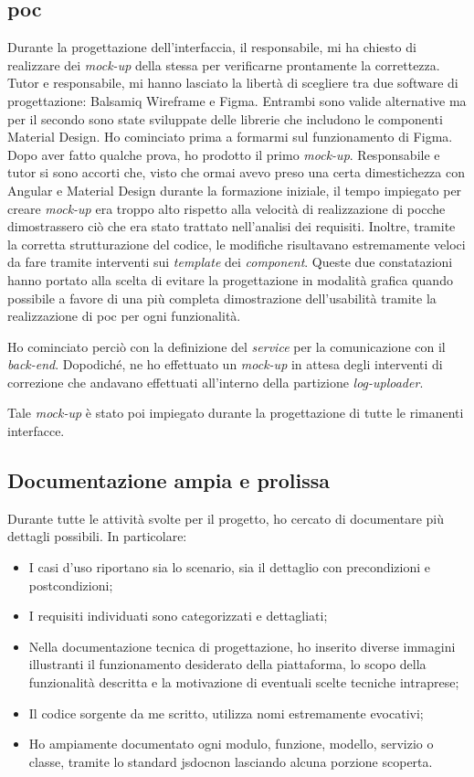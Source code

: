 \subsection{\acrlong{poc}}
Durante la progettazione dell'interfaccia, il responsabile, mi ha chiesto di realizzare dei \textit{mock-up} della stessa per verificarne prontamente la correttezza.
Tutor e responsabile, mi hanno lasciato la libertà di scegliere tra due software di progettazione: Balsamiq Wireframe e Figma. Entrambi sono valide alternative ma per il secondo sono state sviluppate delle librerie che includono le componenti Material Design.
Ho cominciato prima a formarmi sul funzionamento di Figma. Dopo aver fatto qualche prova, ho prodotto il primo \textit{mock-up}. Responsabile e tutor si sono accorti che, visto che ormai avevo preso una certa dimestichezza con Angular e Material Design durante la formazione iniziale, il tempo impiegato per creare \textit{mock-up} era troppo alto rispetto alla velocità di realizzazione di \acrshort{poc}\glsfirstoccur che dimostrassero ciò che era stato trattato nell'analisi dei requisiti. Inoltre, tramite la corretta strutturazione del codice, le modifiche risultavano estremamente veloci da fare tramite interventi sui \textit{template} dei \textit{component}.
Queste due constatazioni hanno portato alla scelta di evitare la progettazione in modalità grafica quando possibile a favore di una più completa dimostrazione dell'usabilità tramite la realizzazione di \acrlong{poc} per ogni funzionalità.

Ho cominciato perciò con la definizione del \textit{service} per la comunicazione con il \textit{back-end}. Dopodiché, ne ho effettuato un \textit{mock-up} in attesa degli interventi di correzione che andavano effettuati all'interno della partizione \textit{log-uploader}.

Tale \textit{mock-up} è stato poi impiegato durante la progettazione di tutte le rimanenti interfacce.
\newpage
\subsection{Documentazione ampia e prolissa}
Durante tutte le attività svolte per il progetto, ho cercato di documentare più dettagli possibili.
In particolare:
\begin{itemize}
    \item I casi d'uso riportano sia lo scenario, sia il dettaglio con precondizioni e postcondizioni;
    \item I requisiti individuati sono categorizzati e dettagliati;
    \item Nella documentazione tecnica di progettazione, ho inserito diverse immagini illustranti il funzionamento desiderato della piattaforma, lo scopo della funzionalità descritta e la motivazione di eventuali scelte tecniche intraprese;
    \item Il codice sorgente da me scritto, utilizza nomi estremamente evocativi; \item Ho ampiamente documentato ogni modulo, funzione, modello, servizio o classe, tramite lo standard \gls{jsdoc}\glsfirstoccur non lasciando alcuna porzione scoperta.
\end{itemize}

